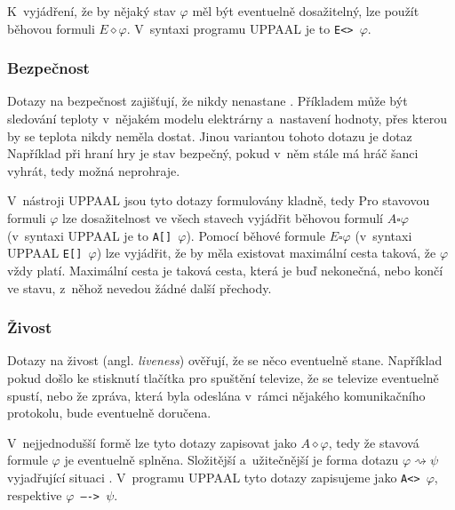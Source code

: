 K~vyjádření, že by nějaký stav $\varphi$ měl být eventuelně dosažitelný, lze použít běhovou formuli $E \diamond \varphi$. V~syntaxi programu UPPAAL je to \texttt{E<> $\varphi$}.

\subsubsection{Bezpečnost}
Dotazy na bezpečnost zajišťují, že nikdy nenastane . Příkladem může být sledování teploty v~nějakém modelu elektrárny a~nastavení hodnoty, přes kterou by se teplota nikdy neměla dostat. Jinou variantou tohoto dotazu je dotaz  Například při hraní hry je stav bezpečný, pokud v~něm stále má hráč šanci vyhrát, tedy možná neprohraje.

V~nástroji UPPAAL jsou tyto dotazy formulovány kladně, tedy  Pro stavovou formuli $\varphi$ lze dosažitelnost ve všech stavech vyjádřit běhovou formulí $A \square \varphi$ (v~syntaxi UPPAAL je to \texttt{A[] $\varphi$}). Pomocí běhové formule $E \square \varphi$ (v~syntaxi UPPAAL \texttt{E[] $\varphi$}) lze vyjádřit, že by měla existovat maximální cesta taková, že $\varphi$ vždy platí. Maximální cesta je taková cesta, která je buď nekonečná, nebo končí ve stavu, z~něhož nevedou žádné další přechody.

\subsubsection{Živost}
Dotazy na živost (angl. \textit{liveness}) ověřují, že se něco eventuelně stane. Například pokud došlo ke stisknutí tlačítka pro spuštění televize, že se televize eventuelně spustí, nebo že zpráva, která byla odeslána v~rámci nějakého komunikačního protokolu, bude eventuelně doručena.

V~nejjednodušší formě lze tyto dotazy zapisovat jako $A \diamond \varphi$, tedy že stavová formule $\varphi$ je eventuelně splněna. Složitější a~užitečnější je forma dotazu $\varphi \rightsquigarrow \psi$ vyjadřující situaci . V~programu UPPAAL tyto dotazy zapisujeme jako \texttt{A<> $\varphi$}, respektive \texttt{$\varphi$ ----> $\psi$}.

